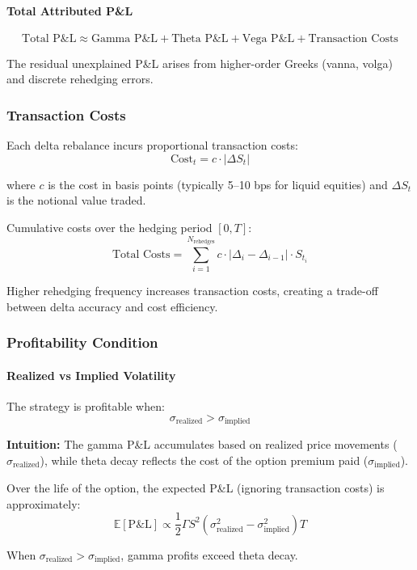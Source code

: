 \paragraph{Total Attributed P\&L}

\[
\text{Total P\&L} \approx \text{Gamma P\&L} + \text{Theta P\&L} + \text{Vega P\&L} + \text{Transaction Costs}
\]

The residual unexplained P\&L arises from higher-order Greeks (vanna, volga) and discrete rehedging errors.

\subsubsection{Transaction Costs}

Each delta rebalance incurs proportional transaction costs:
\[
\text{Cost}_t = c \cdot |\Delta S_t|
\]

where $c$ is the cost in basis points (typically 5--10 bps for liquid equities) and $\Delta S_t$ is the notional value traded.

Cumulative costs over the hedging period $[0, T]$:
\[
\text{Total Costs} = \sum_{i=1}^{N_{\text{rehedges}}} c \cdot |\Delta_{i} - \Delta_{i-1}| \cdot S_{t_i}
\]

Higher rehedging frequency increases transaction costs, creating a trade-off between delta accuracy and cost efficiency.

\subsubsection{Profitability Condition}

\paragraph{Realized vs Implied Volatility}

The strategy is profitable when:
\[
\sigma_{\text{realized}} > \sigma_{\text{implied}}
\]

\textbf{Intuition:} The gamma P\&L accumulates based on realized price movements ($\sigma_{\text{realized}}$), while theta decay reflects the cost of the option premium paid ($\sigma_{\text{implied}}$).

Over the life of the option, the expected P\&L (ignoring transaction costs) is approximately:
\[
\mathbb{E}[\text{P\&L}] \propto \frac{1}{2} \Gamma S^2 (\sigma_{\text{realized}}^2 - \sigma_{\text{implied}}^2) T
\]

When $\sigma_{\text{realized}} > \sigma_{\text{implied}}$, gamma profits exceed theta decay.

